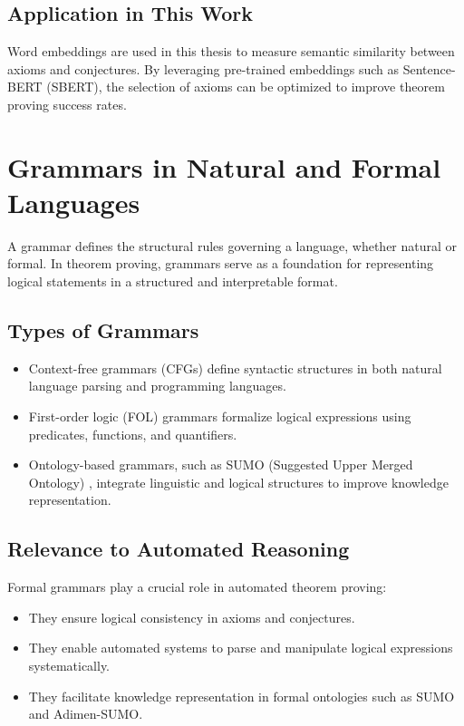 \documentclass[english,version-2020-11]{uzl-thesis}
\begin{document}
\subsection{Application in This Work}
Word embeddings are used in this thesis to measure semantic similarity between axioms and conjectures. By leveraging pre-trained embeddings such as Sentence-BERT (SBERT), the selection of axioms can be optimized to improve theorem proving success rates.

\section{Grammars in Natural and Formal Languages}

A grammar defines the structural rules governing a language, whether natural or formal. In theorem proving, grammars serve as a foundation for representing logical statements in a structured and interpretable format.

\subsection{Types of Grammars}
\begin{itemize}
    \item Context-free grammars (CFGs) define syntactic structures in both natural language parsing and programming languages.
    \item First-order logic (FOL) grammars formalize logical expressions using predicates, functions, and quantifiers.
    \item Ontology-based grammars, such as SUMO (Suggested Upper Merged Ontology) \cite{Niles2001}, integrate linguistic and logical structures to improve knowledge representation.
\end{itemize}

\subsection{Relevance to Automated Reasoning}
Formal grammars play a crucial role in automated theorem proving:
\begin{itemize}
    \item They ensure logical consistency in axioms and conjectures.
    \item They enable automated systems to parse and manipulate logical expressions systematically.
    \item They facilitate knowledge representation in formal ontologies such as SUMO and Adimen-SUMO.
\end{itemize}
\end{document}
